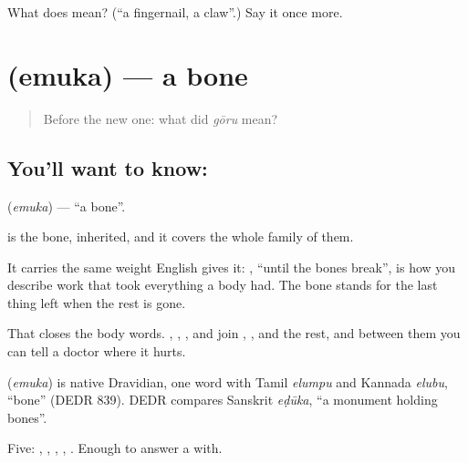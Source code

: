 \begin{tcolorbox}[breakable,colback=teal!4,colframe=teal!35!black,title={Before you move on}]
What does  mean? (\textquotedblleft{}a fingernail, a claw\textquotedblright{}.) Say it once more.
\end{tcolorbox}
\section[\texorpdfstring{\te{ఎముక} (emuka)}{ఎముక (emuka)}]{ (emuka) — a bone}

\label{lesson:TE-C57-bone}



\begin{quote}
Before the new one: what did \emph{gōru} mean?
\end{quote}

\subsection*{You'll want to know: }
\textbf{} (\emph{emuka}) — \textquotedblleft{}a bone\textquotedblright{}.

 is the bone, inherited, and it covers the whole family of them.

It carries the same weight English gives it:  , \textquotedblleft{}until the bones break\textquotedblright{}, is how you describe work that took everything a body had. The bone stands for the last thing left when the rest is gone.

That closes the body words. , , ,  and  join , ,  and the rest, and between them you can tell a doctor where it hurts.

\begin{cousinweb}
\textbf{} (\emph{emuka}) is native Dravidian, one word with Tamil \emph{elumpu} and Kannada \emph{elubu}, \textquotedblleft{}bone\textquotedblright{} (DEDR 839). DEDR compares Sanskrit \emph{eḍūka}, \textquotedblleft{}a monument holding bones\textquotedblright{}.
\end{cousinweb}

\begin{grammarlens}[title={What you've built}]
Five: , , , , . Enough to answer a  with.
\end{grammarlens}

